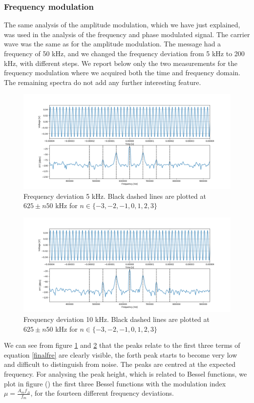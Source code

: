 \documentclass[a4paper,10pt]{article}
\begin{document}
\subsubsection{Frequency modulation}
The same analysis of the amplitude modulation, which we have just explained, was used in the analysis of the frequency and phase modulated signal. The carrier wave was the same as for the amplitude modulation. The message had a frequency of 50 kHz, and we changed the frequency deviation from 5 kHz to 200 kHz, with different steps. We report below only the two measurements for the frequency modulation where we acquired both the time and frequency domain. The remaining spectra do not add any further interesting feature. 
\begin{figure}[H]
\centering
\includegraphics[width=\textwidth]{freq1}
\caption{Frequency deviation 5 kHz. Black dashed lines are plotted at $625\pm n50$ kHz for $n\in\{-3,-2,-1,0,1,2,3\}$}\label{freq1}
\end{figure}
\begin{figure}[H]
\centering
\includegraphics[width=\textwidth]{freq2}
\caption{Frequency deviation 10 kHz. Black dashed lines are plotted at $625\pm n50$ kHz for $n\in\{-3,-2,-1,0,1,2,3\}$}\label{freq2}
\end{figure}
We can see from figure \ref{freq1} and \ref{freq2} that the peaks relate to the first three terms of equation \eqref{finalfre} are clearly visible, the forth peak starts to become very low and difficult to distinguish from noise. The peaks are centred at the expected frequency. For analysing the peak height, which is related to Bessel functions, we plot in figure () the first three Bessel functions with the modulation index  $\mu = \displaystyle\frac{A_m f_\Delta }{f_m }$, for the fourteen different frequency deviations. 
\end{document}

